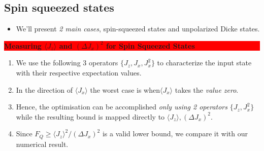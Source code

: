 \documentclass{beamer}
\newcommand{\expect}[1]{\ensuremath{\langle #1 \rangle}}
\newcommand{\varian}[1]{\ensuremath{\left(\Delta #1 \right)^2}}
\begin{document}
	\subsection{Spin squeezed states}

		\begin{frame}

			\begin{itemize}
				\item<1-> We'll present \emph{\color{blue}2 main cases}, spin-squeezed states and unpolarized Dicke states.
			\end{itemize}
			\begin{center}
        \colorbox{red}{
            \begin{minipage}[t]{1.0\textwidth}
            	\textbf{\large Measuring $\expect{J_z}$ and $\varian{J_x}$ for Spin Squeezed States}
            \end{minipage}
      	}
			\end{center}

			\vspace{8px}

			\begin{enumerate}
				\item<1-> We use the following 3 operators {\color{blue}$\{ J_z,J_x,J_x^2 \}$} to characterize the input state with their respective expectation values.
				\item<2-> In the direction of $\expect{J_x}$ the worst case is when$\expect{J_x}$ takes the \emph{\color{blue}value zero}.
				\item<3-> Hence, the optimisation can be accomplished \emph{\color{blue} only using 2 operators} $\{ J_z,J_x^2 \}$ while the resulting bound is mapped directly to $\expect{J_z},\varian{J_x}$.
				\item<4-> Since $F_Q\geq \expect{J_z}^2/\varian{J_x}$ is a valid lower bound, we compare it with our numerical result.
			\end{enumerate}

		\end{frame}
\end{document}
